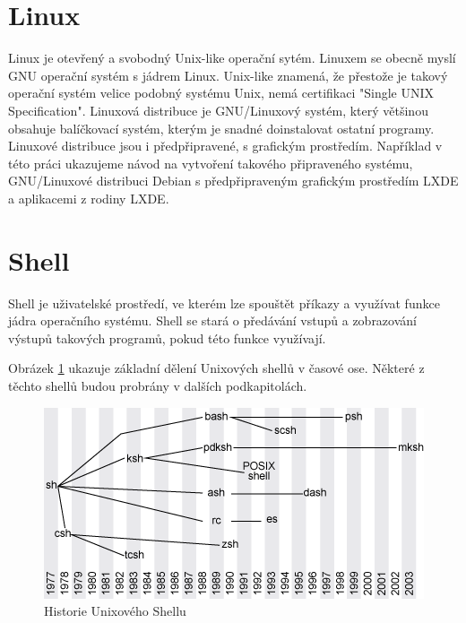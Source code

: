 \documentclass[thesis=M,czech]{FITthesis}[2012/06/26]
\begin{document}


\section{Linux}
Linux je otevřený a svobodný Unix-like operační sytém. Linuxem se obecně myslí GNU operační systém s jádrem Linux. Unix-like znamená, že přestože je takový operační systém velice podobný systému Unix, nemá certifikaci "Single UNIX Specification". Linuxová distribuce je GNU/Linuxový systém, který většinou obsahuje balíčkovací systém, kterým je snadné doinstalovat ostatní programy. Linuxové distribuce jsou i předpřipravené, s grafickým prostředím. Například v této práci ukazujeme návod na vytvoření takového připraveného systému, GNU/Linuxové distribuci Debian s předpřipraveným grafickým prostředím LXDE a aplikacemi z rodiny LXDE.






\section{Shell}

Shell je uživatelské prostředí, ve kterém lze spouštět příkazy a využívat funkce jádra operačního systému. Shell se stará o předávání vstupů a zobrazování výstupů takových programů, pokud této funkce využívají.

Obrázek \ref{fig:shell_history} ukazuje základní dělení Unixových shellů v časové ose. Některé z těchto shellů budou probrány v dalších podkapitolách.

\begin{figure}[htb]\centering
	\includegraphics[width=\textwidth]{./images/tmp_shell_history}
	\caption{Historie Unixového Shellu}
	\label{fig:shell_history}
\end{figure}
\end{document}
